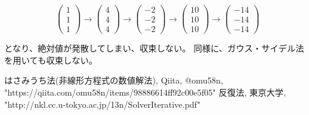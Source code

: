 \documentclass{jsarticle}
\begin{document}
        \begin{equation*}
            \left(
                \begin{array}{c}
                    1 \\
                    1 \\
                    1
                \end{array}
            \right) \rightarrow \left(
                \begin{array}{c}
                    4 \\
                    4 \\
                    4
                \end{array}
            \right) \rightarrow \left(
                \begin{array}{c}
                    -2 \\
                    -2 \\
                    -2
                \end{array}
            \right) \rightarrow \left(
                \begin{array}{c}
                    10 \\
                    10 \\
                    10
                \end{array}
            \right) \rightarrow \left(
                \begin{array}{c}
                    -14 \\
                    -14 \\
                    -14
                \end{array}
            \right)
        \end{equation*}

        となり、絶対値が発散してしまい、収束しない。
        同様に、ガウス・サイデル法を用いても収束しない。

    \begin{thebibliography}{99}
         はさみうち法(非線形方程式の数値解法), Qiita, @omu58n, \\
            "https://qiita.com/omu58n/items/98886614ff92c00e5f05"
         反復法, 東京大学, "http://nkl.cc.u-tokyo.ac.jp/13n/SolverIterative.pdf"
    \end{thebibliography}
\end{document}
